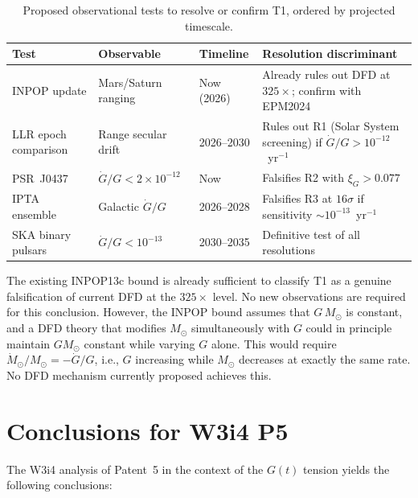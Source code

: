 \documentclass[aps,prd,twocolumn,superscriptaddress,nofootinbib,longbibliography]{revtex4-2}
\newcommand{\ee}[1]{\times 10^{#1}}
\begin{document}
\begin{table}[h]
\caption{Proposed observational tests to resolve or confirm T1, ordered by
projected timescale.}
\label{tab:roadmap}
\begin{ruledtabular}
\begin{tabular}{p{1.5cm}p{2cm}p{1.5cm}p{2.5cm}}
\textbf{Test} & \textbf{Observable} & \textbf{Timeline} & \textbf{Resolution discriminant}\\
\hline
INPOP update & Mars/Saturn ranging & Now (2026) & Already rules out DFD at $325\times$; confirm with EPM2024\\
LLR epoch comparison & Range secular drift & 2026--2030 & Rules out R1 (Solar System screening) if $\dot{G}/G > 10^{-12}$~yr$^{-1}$\\
PSR~J0437 & $\dot{G}/G < 2\ee{-12}$ & Now & Falsifies R2 with $\xi_G > 0.077$\\
IPTA ensemble & Galactic $\dot{G}/G$ & 2026--2028 & Falsifies R3 at $16\sigma$ if sensitivity $\sim 10^{-13}$~yr$^{-1}$\\
SKA binary pulsars & $\dot{G}/G < 10^{-13}$ & 2030--2035 & Definitive test of all resolutions\\
\end{tabular}
\end{ruledtabular}
\end{table}

The existing INPOP13c bound is already sufficient to classify T1 as a genuine
falsification of current DFD at the $325\times$ level.  No new observations
are required for this conclusion.  However, the INPOP bound assumes that
$G\,M_\odot$ is constant, and a DFD theory that modifies $M_\odot$
simultaneously with $G$ could in principle maintain $GM_\odot$ constant while
varying $G$ alone.  This would require $\dot{M}_\odot/M_\odot = -\dot{G}/G$,
i.e., $G$ increasing while $M_\odot$ decreases at exactly the same rate.
No DFD mechanism currently proposed achieves this.

\section{Conclusions for W3i4 P5}
\label{sec:conclusions}

The W3i4 analysis of Patent~5 in the context of the $G(t)$ tension yields
the following conclusions:
\end{document}
